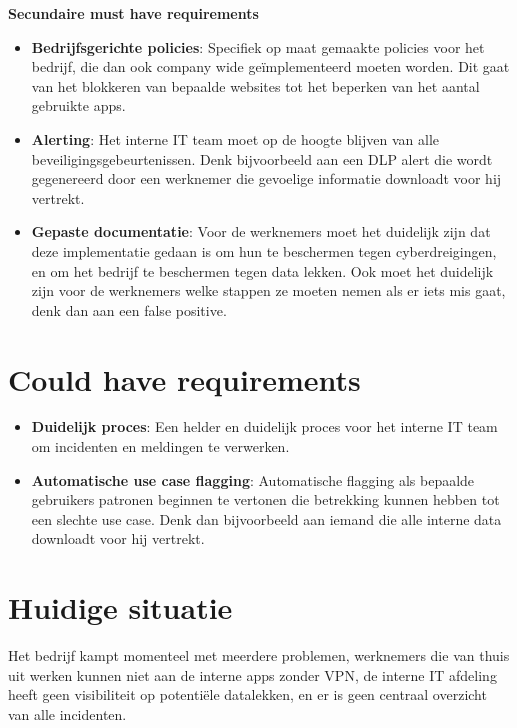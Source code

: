 \textbf{Secundaire must have requirements}
\begin{itemize}
  \item \textbf{Bedrijfsgerichte policies}: Specifiek op maat gemaakte policies voor het bedrijf, die dan ook company wide geïmplementeerd moeten worden. Dit gaat van het blokkeren van bepaalde websites tot het beperken van het aantal gebruikte apps.
  \item \textbf{Alerting}: Het interne IT team moet op de hoogte blijven van alle beveiligingsgebeurtenissen. Denk bijvoorbeeld aan een DLP alert die wordt gegenereerd door een werknemer die gevoelige informatie downloadt voor hij vertrekt.
  \item \textbf{Gepaste documentatie}: Voor de werknemers moet het duidelijk zijn dat deze implementatie gedaan is om hun te beschermen tegen cyberdreigingen, en om het bedrijf te beschermen tegen data lekken. Ook moet het duidelijk zijn voor de werknemers welke stappen ze moeten nemen als er iets mis gaat, denk dan aan een false positive.
\end{itemize}

\section{Could have requirements}
\begin{itemize}
  \item \textbf{Duidelijk proces}: Een helder en duidelijk proces voor het interne IT team om incidenten en meldingen te verwerken. 
  \item \textbf{Automatische use case flagging}: Automatische flagging als bepaalde gebruikers patronen beginnen te vertonen die betrekking kunnen hebben tot een slechte use case. Denk dan bijvoorbeeld aan iemand die alle interne data downloadt voor hij vertrekt.
\end{itemize}

\section{Huidige situatie}
Het bedrijf kampt momenteel met meerdere problemen, werknemers die van thuis uit werken kunnen niet aan de interne apps zonder VPN, de interne IT afdeling heeft geen visibiliteit op potentiële datalekken, en er is geen centraal overzicht van alle incidenten.
